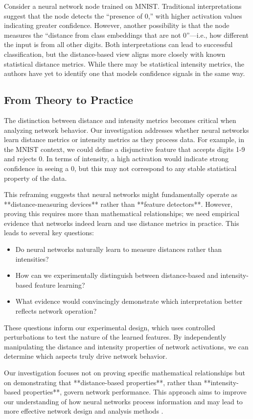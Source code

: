 Consider a neural network node trained on MNIST. Traditional interpretations suggest that the node detects the “presence of 0,” with higher activation values indicating greater confidence. However, another possibility is that the node measures the “distance from class embeddings that are not 0”—i.e., how different the input is from all other digits. Both interpretations can lead to successful classification, but the distance-based view aligns more closely with known statistical distance metrics. While there may be statistical intensity metrics, the authors have yet to identify one that models confidence signals in the same way.

\subsection{From Theory to Practice}

The distinction between distance and intensity metrics becomes critical when analyzing network behavior. Our investigation addresses whether neural networks learn distance metrics or intensity metrics as they process data. For example, in the MNIST context, we could define a disjunctive feature that accepts digits 1-9 and rejects 0. In terms of intensity, a high activation would indicate strong confidence in seeing a 0, but this may not correspond to any stable statistical property of the data.

This reframing suggests that neural networks might fundamentally operate as **distance-measuring devices** rather than **feature detectors**. However, proving this requires more than mathematical relationships; we need empirical evidence that networks indeed learn and use distance metrics in practice. This leads to several key questions:

\begin{itemize}
    \item Do neural networks naturally learn to measure distances rather than intensities?
    \item How can we experimentally distinguish between distance-based and intensity-based feature learning?
    \item What evidence would convincingly demonstrate which interpretation better reflects network operation?
\end{itemize}

These questions inform our experimental design, which uses controlled perturbations to test the nature of the learned features. By independently manipulating the distance and intensity properties of network activations, we can determine which aspects truly drive network behavior.

Our investigation focuses not on proving specific mathematical relationships but on demonstrating that **distance-based properties**, rather than **intensity-based properties**, govern network performance. This approach aims to improve our understanding of how neural networks process information and may lead to more effective network design and analysis methods \cite{montavon2018methods, samek2019explainable}.